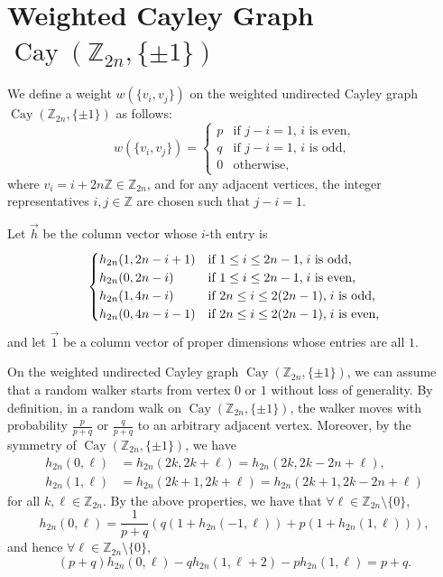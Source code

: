 \documentclass[12pt, leqno]{amsart}
\numberwithin{equation}{section}
\theoremstyle{plain}
\theoremstyle{definition}
\newcommand{\ZZ}{\mathbb{Z}}
\newcommand{\0}{\mathbf{0}}
\DeclareMathOperator{\Cay}{Cay}
\begin{document}
\section{Weighted Cayley Graph $\Cay(\ZZ_{2n},\{\pm1\})$}

We define a weight $w(\{v_i,v_j\})$ on the weighted undirected Cayley graph $\Cay(\ZZ_{2n},\{\pm1\})$ as follows:
\[
w(\{v_i,v_j\})=
\begin{cases}
p &\text{if $j-i=1$, $i$ is even,}\\
q &\text{if $j-i=1$, $i$ is odd,}\\
0 &\text{otherwise,}
\end{cases}
\]
where $v_i=i+2n\ZZ\in\ZZ_{2n}$, and for any adjacent vertices, the integer representatives $i,j\in\ZZ$ are chosen such that $j-i=1$.

Let $\vec{h}$ be the column vector whose $i$-th entry is 
\[
\begin{cases}
h_{2n}(1,2n-i+1) &\text{if $1\leq i\leq 2n-1$,\;$i$ is odd,}\\
h_{2n}(0,2n-i) &\text{if $1\leq i\leq 2n-1$,\;$i$ is even,}\\
h_{2n}(1,4n-i) &\text{if $2n\leq i\leq 2(2n-1)$,\;$i$ is odd,}\\
h_{2n}(0,4n-i-1) &\text{if $2n\leq i\leq 2(2n-1)$,\;$i$ is even,}
\end{cases}
\]
and let $\vec{1}$ be a column vector of proper dimensions whose entries are all $1$.

On the weighted undirected Cayley graph $\Cay(\ZZ_{2n},\{\pm1\})$, we can assume that a random walker starts from vertex $0$ or $1$ without loss of generality.
By definition, in a random walk on $\Cay(\ZZ_{2n},\{\pm1\})$, the walker moves with probability $\frac{p}{p+q}$ or $\frac{q}{p+q}$ to an arbitrary adjacent vertex.
Moreover, by the symmetry of $\Cay(\ZZ_{2n},\{\pm1\})$, we have 
\begin{align*}
h_{2n}(0,\ell)&=h_{2n}(2k,2k+\ell)=h_{2n}(2k,2k-2n+\ell),\\
h_{2n}(1,\ell)&=h_{2n}(2k+1,2k+\ell)=h_{2n}(2k+1,2k-2n+\ell)
\end{align*}
for all $k,\ell \in\mathbb{Z}_{2n}$.
By the above properties, we have that $\forall \ell \in\mathbb{Z}_{2n}\setminus\{0\}$, 
\[
h_{2n}(0,\ell)=\frac{1}{p+q}\left(q(1+h_{2n}(-1,\ell))+p(1+h_{2n}(1,\ell))\right),
\]
and hence $\forall \ell \in\mathbb{Z}_{2n}\setminus\{0\}$,
\[
(p+q)h_{2n}(0,\ell)-qh_{2n}(1,\ell+2)-ph_{2n}(1,\ell)=p+q.
\] 
\end{document}

